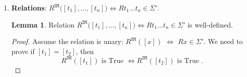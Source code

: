 \documentclass[11pt,letterpaper]{book}
\theoremstyle{definition}
\newtheorem{lemma}{Lemma}[section]
\begin{document}
\begin{enumerate}
\begin{proof}
\begin{eqnarray*}
& & x=y \rightarrow f(x) = f(y) \quad \text{by
(\ref{def:equality_axiom_2})} \\
& \Rightarrow & \Sigma' \vdash \bigg( x=y \rightarrow f(x) = f(y)  \bigg) \\
& \Rightarrow & \Sigma' \vdash \bigg( \forall x \forall y ( x=y
\rightarrow f(x) = f(y) ) \bigg) \quad \text{by Lemma
\ref{lemma:deduce_to_forall}} \\
& \Rightarrow & \Sigma' \vdash \bigg( t_1 = t_2 \rightarrow f(t_1) =
f(t_2) \bigg) \\ 
& & \quad \text{by (\ref{def:quantify_axiom_1}) twice for $x$
by $t_1$ and $y$ by $t_2$} \\
& & \text{with } (t_1 = t_2) \in \Sigma' \iff \Sigma' \vdash (t_1 = t_2)
\quad \text{by Lemma \ref{lemma:sentence_in_Sigma_prime_deducible}} \\
& \Rightarrow & \Sigma' \vdash f(t_1) = f(t_2) \quad \text{by rule (PC)
at Definition \ref{def:infer_rule_PC}}  \\
& \Rightarrow &  \big( f(t_1) = f(t_2) \big) \in \Sigma' \quad \text{by
Lemma \ref{lemma:sentence_in_Sigma_prime_deducible}}
\end{eqnarray*}

\end{proof}

\item{\textbf{Relations}: $R^{\mathfrak{M}}\big( [t_1], \ldots,
[t_{n}]\big) \iff R t_1 \ldots t_n \in \Sigma'  $. }

\begin{lemma}
Relation  $R^{\mathfrak{M}}\big( [t_1], \ldots, [t_{n}]\big) \iff R t_1
\ldots t_n \in \Sigma'  $ is well-defined.

\end{lemma}

\begin{proof}
Assume the relation is unary: 
$R^{\mathfrak{M}}([x])$ $\iff$ $R x \in
\Sigma'$. We need to prove if $[t_1] = [t_2]$, then
$$R^{\mathfrak{M}}([t_1]) \text{ is True }  \iff R^{\mathfrak{M}}([t_2])
\text{ is True }. $$


\end{proof}
\end{enumerate}
\end{document}
